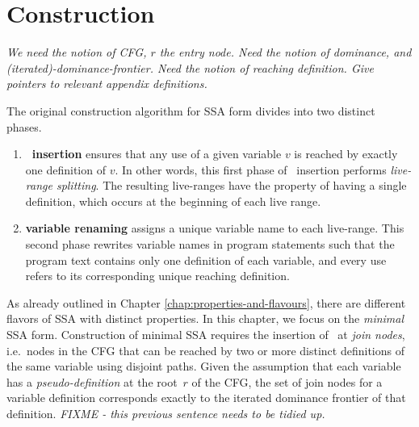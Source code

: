{\section{Construction}
{\em We need the notion of CFG, $r$ the entry node. Need the notion of
  dominance, and (iterated)-dominance-frontier. Need the notion of reaching
  definition. Give pointers to relevant appendix definitions.}


The original construction algorithm for SSA form \cite{cytron91efficiently}
divides into two distinct phases.
\begin{enumerate}
\item \textbf{\phiop\ insertion} ensures that any use of a given variable $v$ is reached 
by exactly one definition of $v$. In other words, this first phase of \phiop\ insertion performs \textit{live-range splitting}.
The resulting live-ranges have the property of having a single definition, which occurs at the beginning of each live range.
\item \textbf{variable renaming} assigns a unique variable name to each live-range. This second phase rewrites variable names in program statements such that the program text contains only one definition of each variable, and every use refers to its corresponding unique reaching definition.
\end{enumerate}

As already outlined in Chapter \ref{chap:properties-and-flavours},
there are different flavors of SSA with distinct properties.
In this chapter, we focus on the \textit{minimal} SSA form.
Construction of minimal SSA 
requires the insertion of \phiops\ at \textit{join nodes},
i.e.\ nodes in the CFG that can be reached by two or more distinct definitions of the same variable using disjoint paths. 
Given the assumption that each variable has a {\em pseudo-definition} at the root~$r$ of the CFG, the set of join nodes for a variable definition corresponds exactly to the iterated dominance frontier of that definition.
\emph{FIXME - this previous sentence needs to be tidied up.}

}
